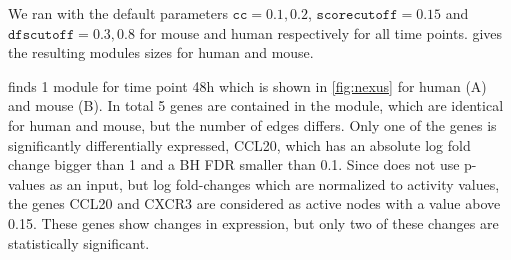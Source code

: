 We ran \nexus{} with the default parameters $\mathtt{cc = 0.1,0.2}$, $\mathtt{scorecutoff=0.15}$ and $\mathtt{dfscutoff=0.3,0.8}$ for mouse and human respectively for all time points.  gives the resulting modules sizes for human and mouse.

\begin{table}[htbp]
	\centering
	\caption{\textbf{Modules calculated with \nexus{} for all time points.}
	Shown are the sizes in number of nodes of the first 15 representative solutions and the average sizes for the human subnetwork and for the mouse subnetwork in brackets.
	The last column lists the number of solutions for each time point.
	No solutions were obtained for time points \unit{24}{h} and \unit{72}{h}.
	}
	\label{tab:nexus_all}
\end{table}

\nexus{} finds 1 module for time point \unit{48}{h} which is shown in \cref{fig:nexus} for human (A) and mouse (B).
In total 5 genes are contained in the module, which are identical for human and mouse, but the number of edges differs.
Only one of the genes is significantly differentially expressed, CCL20, which has an absolute log fold change bigger than 1 and a BH FDR smaller than 0.1.
Since \nexus{} does not use p-values as an input, but log fold-changes which are normalized to activity values, the genes CCL20 and CXCR3 are considered as active nodes with a value above 0.15.
These genes show changes in expression, but only two of these changes are statistically significant.

